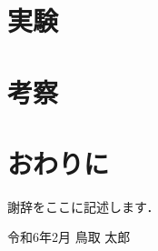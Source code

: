 \documentclass[dvipdfmx]{thesis}
\begin{document}
\chapter{実験}
\chapter{考察}
\chapter{おわりに}
\begin{acknowledge}
謝辞をここに記述します．
\begin{flushright}
令和6年2月 鳥取 太郎
\end{flushright}
\end{acknowledge}


\end{document}
